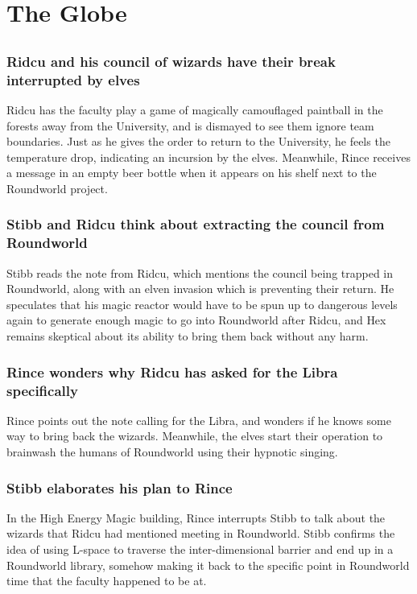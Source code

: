 \section{The Globe}


\subsection{}
\subsubsection{\Gls{Ridcu} and his council of wizards have their break interrupted by elves}
\Gls{Ridcu} has the faculty play a game of magically camouflaged paintball in the forests away
from the University, and is dismayed to see them ignore team boundaries. Just as he gives the order
to return to the University, he feels the temperature drop, indicating an incursion by the elves.
Meanwhile, \Gls{Rince} receives a message in an empty beer bottle when it appears on his shelf next
to the Roundworld project.

\subsubsection{\Gls{Stibb} and \Gls{Ridcu} think about extracting the council from Roundworld}
\Gls{Stibb} reads the note from \Gls{Ridcu}, which mentions the council being trapped in Roundworld,
along with an elven invasion which is preventing their return. He speculates that his magic reactor
would have to be spun up to dangerous levels again to generate enough magic to go into Roundworld
after \Gls{Ridcu}, and \Gls{Hex} remains skeptical about its ability to bring them back without any
harm.

\subsubsection{\Gls{Rince} wonders why \Gls{Ridcu} has asked for the \Gls{Libra} specifically}
\Gls{Rince} points out the note calling for the \Gls{Libra}, and wonders if he knows some way to
bring back the wizards. Meanwhile, the elves start their operation to brainwash the humans of
Roundworld using their hypnotic singing.

\subsubsection{\Gls{Stibb} elaborates his plan to \Gls{Rince}}
In the High Energy Magic building, \Gls{Rince} interrupts \Gls{Stibb} to talk about the wizards
that \Gls{Ridcu} had mentioned meeting in Roundworld. \Gls{Stibb} confirms the idea of using L-space
to traverse the inter-dimensional barrier and end up in a Roundworld library, somehow making it back
to the specific point in Roundworld time that the faculty happened to be at.

